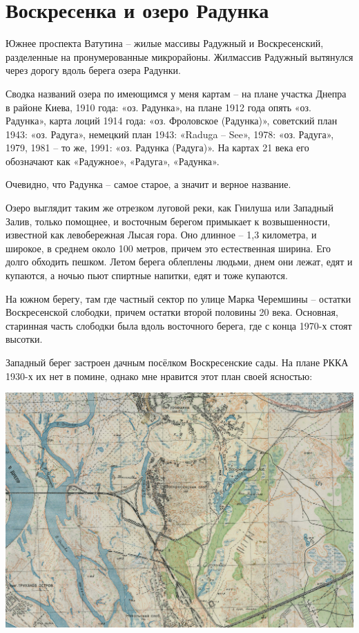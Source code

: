 \chapter{Воскресенка и озеро Радунка}

Южнее проспекта Ватутина – жилые массивы Радужный и Воскресенский, разделенные на пронумерованные микрорайоны. Жилмассив Радужный вытянулся через дорогу вдоль берега озера Радунки.

Сводка названий озера по имеющимся у меня картам – на плане участка Днепра в районе Киева, 1910 года: «оз. Радунка», на плане 1912 года опять «оз. Радунка», карта лоций 1914 года: «оз. Фроловское (Радунка)», советский план 1943: «оз. Радуга», немецкий план 1943: «Raduga – See», 1978: «оз. Радуга», 1979, 1981 – то же, 1991: «оз. Радунка (Радуга)». На картах 21 века его обозначают как «Радужное», «Радуга», «Радунка».

Очевидно, что Радунка – самое старое, а значит и верное название.

Озеро выглядит таким же отрезком луговой реки, как Гнилуша или Западный Залив, только помощнее, и восточным берегом примыкает к возвышенности, известной как левобережная Лысая гора. Оно длинное – 1,3 километра, и широкое, в среднем около 100 метров, причем это естественная ширина. Его долго обходить пешком. Летом берега облеплены людьми, днем они лежат, едят и купаются, а ночью пьют спиртные напитки, едят и тоже купаются. 

На южном берегу, там где частный сектор по улице Марка Черемшины – остатки Воскресенской слободки, причем остатки второй половины 20 века. Основная, старинная часть слободки была вдоль восточного берега, где с конца 1970-х стоят высотки.

Западный берег застроен дачным посёлком Воскресенские сады. На плане РККА 1930-х их нет в помине, однако мне нравится этот план своей ясностью:

\begin{center}
\includegraphics[width=\linewidth]{chast-gorodki/radujnoe/rkka-voskr-s.jpg}
\end{center}

